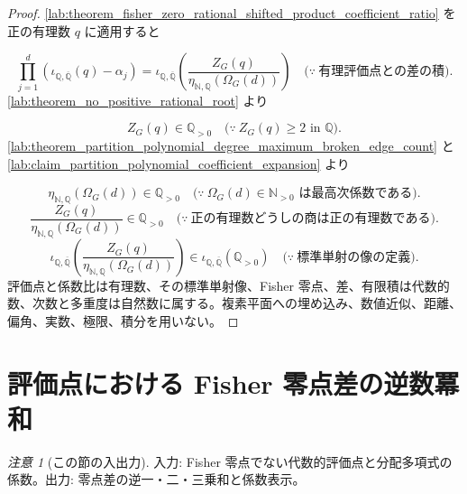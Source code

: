 \documentclass[11pt,a4paper]{article}
\theoremstyle{remark}
\newtheorem{remark}[definition]{注意}
\begin{document}
\begin{proof}
\cref{lab:theorem_fisher_zero_rational_shifted_product_coefficient_ratio}
 を正の有理数
$q$
に適用すると

\[\prod_{j=1}^{d}\left(\iota_{\mathbb Q,\overline{\mathbb Q}}(q)-\alpha_j\right)
=
\iota_{\mathbb Q,\overline{\mathbb Q}}\!\left(
  \frac{
    Z_G(q)
  }{
    \eta_{\mathbb N,\mathbb Q}(\Omega_G(d))
  }
\right)
\quad\bigl(\because\ \text{有理評価点との差の積}\bigr).\]
\cref{lab:theorem_no_positive_rational_root}
 より

\[Z_G(q)\in\mathbb Q_{>0}
\quad\bigl(\because\ Z_G(q)\ge2\text{ in }\mathbb Q\bigr).\]
\cref{lab:theorem_partition_polynomial_degree_maximum_broken_edge_count}
 と
\cref{lab:claim_partition_polynomial_coefficient_expansion}
より

\[\eta_{\mathbb N,\mathbb Q}(\Omega_G(d))\in\mathbb Q_{>0}
\quad\bigl(\because\ \Omega_G(d)\in\mathbb N_{>0}\text{ は最高次係数である}\bigr).\]
\[\frac{
  Z_G(q)
}{
  \eta_{\mathbb N,\mathbb Q}(\Omega_G(d))
}
\in\mathbb Q_{>0}
\quad\bigl(\because\ \text{正の有理数どうしの商は正の有理数である}\bigr).\]
\[\iota_{\mathbb Q,\overline{\mathbb Q}}\!\left(
  \frac{
    Z_G(q)
  }{
    \eta_{\mathbb N,\mathbb Q}(\Omega_G(d))
  }
\right)
\in\iota_{\mathbb Q,\overline{\mathbb Q}}(\mathbb Q_{>0})
\quad\bigl(\because\ \text{標準単射の像の定義}\bigr).\]
評価点と係数比は有理数、その標準単射像、Fisher 零点、差、有限積は代数的数、次数と多重度は自然数に属する。複素平面への埋め込み、数値近似、距離、偏角、実数、極限、積分を用いない。

\end{proof}

\section{評価点における Fisher 零点差の逆数冪和}

\begin{remark}[この節の入出力]
入力: Fisher 零点でない代数的評価点と分配多項式の係数。出力: 零点差の逆一・二・三乗和と係数表示。

\end{remark}
\end{document}
